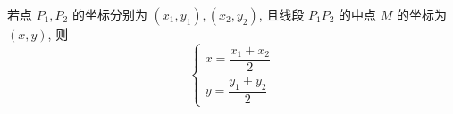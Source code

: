 若点 $P_{1}, P_{2}$ 的坐标分别为 $\left(x_{1}, y_{1}\right),\left(x_{2}, y_{2}\right)$, 且线段 $P_{1} P_{2}$ 的中点 $M$ 的坐标为 $(x, y)$, 则 
$$\begin{cases}
	x=\dfrac{x_{1}+x_{2}}{2}\\[0.5em]
	y=\dfrac{y_{1}+y_{2}}{2}
\end{cases}$$